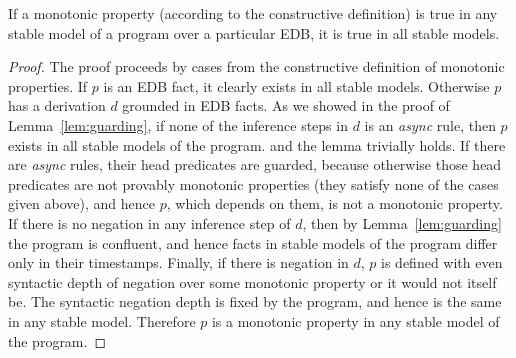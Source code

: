 \begin{lemma}
\label{lem:property}
If a monotonic property (according to the constructive definition) is true in any stable model of a program over a particular EDB, it is true in all stable models. 
\end{lemma}
\begin{proof}
\begin{comment}
Proof sketch: assume a monotonic property is true in one trace and false in another trace.  This means the monotonic property can differentiate between the two traces.  But since all async facts are persisted \jmh{when did we start requiring this?  I think you need to state it as an assumption in the lemma}, all messages eventually rendezvous.  Thus, the monotonic property must be able to observe the condition that some event has not yet occurred (but will eventually occur). \jmh{I don't know what the preceding sentence means; I don't know what it means for a property to observe a condition.}  Monotonic properties cannot observe this though, because the property will be eventually untrue (when the thing that has not yet occurred eventually occurs), thus it is not monotonic. \jmh{That only sorta made sense to me.}

\paa{or alternatively:}
\end{comment}

The proof proceeds by cases from the constructive definition of monotonic properties.
If $p$ is an EDB fact, it clearly exists in all stable models.
Otherwise $p$ has a derivation $d$ grounded in EDB facts.  As we showed in the
proof of Lemma~\ref{lem:guarding}, if none of the inference 
steps in $d$ is an {\em async} rule, then $p$ exists in all stable models
of the program.
and
the lemma trivially holds.  If there are {\em async} rules, their head predicates are guarded,
because otherwise those head predicates are not provably monotonic
properties (they satisfy none of the cases given above),
and hence $p$, which depends on them, is not a monotonic property.  If there 
is no negation in any inference step of $d$, then by Lemma~\ref{lem:guarding} the program
is confluent, and hence facts in stable models of the program differ only in their timestamps.
Finally, if there is negation in $d$, $p$ is defined with even syntactic depth of negation over some
monotonic property or it would not itself be.  The syntactic negation depth is fixed by the
program, and hence is the same in any stable model.  Therefore $p$ is a monotonic 
property in any stable model of the program.
\end{proof}


